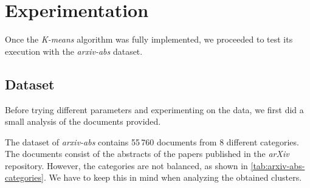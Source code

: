 \section{Experimentation}
Once the \emph{K-means} algorithm was fully implemented, we proceeded to test its execution with the \textit{arxiv-abs} dataset.

\subsection{Dataset}

Before trying different parameters and experimenting on the data, we first did a small analysis of the
documents provided.

The dataset of \emph{arxiv-abs} contains 55\,760 documents from 8 different categories. The documents
consist of the abstracts of the papers published in the \emph{arXiv} repository. However, the categories
are not balanced, as shown in \cref{tab:arxiv-abs-categories}. We have to keep this in mind when
analyzing the obtained clusters.

